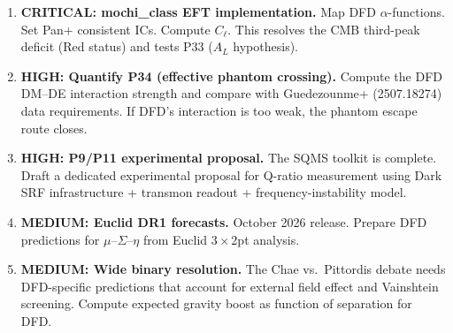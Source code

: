 \documentclass[11pt,a4paper]{article}
\begin{document}
\begin{enumerate}
\item \textbf{CRITICAL: mochi\_class EFT implementation.} Map DFD $\alpha$-functions. Set Pan+ consistent ICs. Compute $C_\ell$. This resolves the CMB third-peak deficit (Red status) and tests P33 ($A_L$ hypothesis).

\item \textbf{HIGH: Quantify P34 (effective phantom crossing).} Compute the DFD DM--DE interaction strength and compare with Guedezounme+ (2507.18274) data requirements. If DFD's interaction is too weak, the phantom escape route closes.

\item \textbf{HIGH: P9/P11 experimental proposal.} The SQMS toolkit is complete. Draft a dedicated experimental proposal for Q-ratio measurement using Dark SRF infrastructure + transmon readout + frequency-instability model.

\item \textbf{MEDIUM: Euclid DR1 forecasts.} October 2026 release. Prepare DFD predictions for $\mu$--$\Sigma$--$\eta$ from Euclid $3\times$2pt analysis.

\item \textbf{MEDIUM: Wide binary resolution.} The Chae vs.\ Pittordis debate needs DFD-specific predictions that account for external field effect and Vainshtein screening. Compute expected gravity boost as function of separation for DFD.
\end{enumerate}
\end{document}
